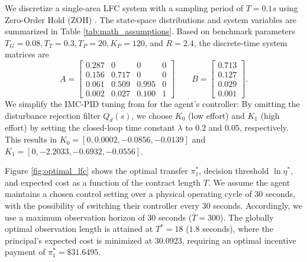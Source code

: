 \documentclass[letterpaper, 10 pt, conference]{ieeeconf}  %
\begin{document}
We discretize a single-area LFC system with a sampling period of $T = 0.1s$ using Zero-Order Hold (ZOH) \cite{Tan2010}. The state-space distributions and system variables are summarized in Table \ref{tab:math_assumptions}. Based on benchmark parameters $T_G = 0.08, T_T = 0.3, T_P = 20, K_P = 120$, and $R =2.4$, the discrete-time system matrices are
\begin{equation*}
A = \begin{bmatrix}
0.287 & 0 & 0 & 0 \\
0.156 & 0.717 & 0 & 0 \\
0.061 & 0.509 & 0.995 & 0 \\
0.002 & 0.027 & 0.100 & 1
\end{bmatrix}\qquad 
B = \begin{bmatrix}
0.713 \\ 0.127 \\ 0.029 \\ 0.001
\end{bmatrix}.
\end{equation*}
We simplify the IMC-PID tuning from \cite{Tan2010} for the agent's controller: By omitting the disturbance rejection filter $Q_d(s)$, we choose $K_0$ (low effort) and $K_1$ (high effort) by setting the closed-loop time constant $\lambda$ to $0.2$ and $0.05$, respectively. This results in $K_0 = [0, 0.0002, -0.0856, -0.0139]$ and $K_1 = [0, -2.2033, -0.6932, -0.0556]$. 

Figure \ref{fig:optimal_lfc} shows the optimal transfer $\pi_1^*$, decision threshold $\ln \eta^*$, and expected cost as a function of the contract length $T$. We assume the agent maintains a chosen control setting over a physical operating cycle of 30 seconds, with the possibility of switching their controller every 30 seconds. Accordingly, we use a maximum observation horizon of 30 seconds ($\overline{T} = 300$). The globally optimal observation length is attained at $T^* = 18$ ($1.8$ seconds), where the principal’s expected cost is minimized at $30.0923$, requiring an optimal incentive payment of $\pi_1^* = \$31.6495$.
\end{document}

